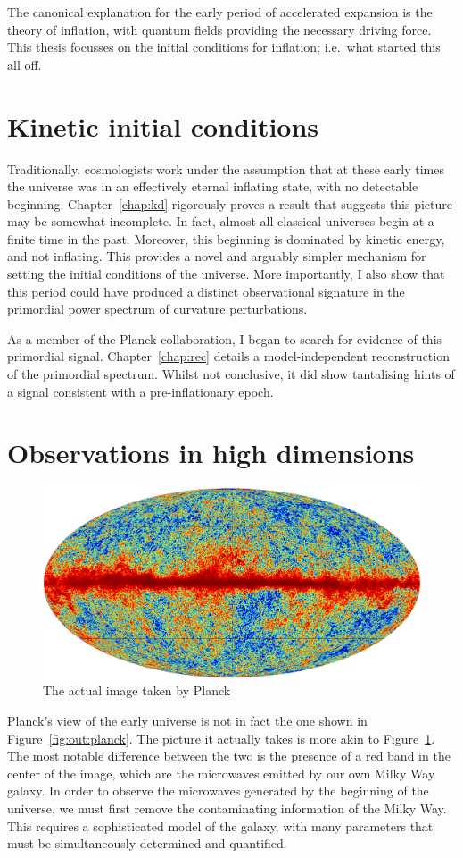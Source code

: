 The canonical explanation for the early period of accelerated expansion is the theory of inflation, with quantum fields providing the necessary driving force. This thesis focusses on the initial conditions for inflation; i.e.\ what started this all off.

\section{Kinetic initial conditions}

Traditionally, cosmologists work under the assumption that at these early times the universe was in an effectively eternal inflating state, with no detectable beginning. Chapter~\ref{chap:kd} rigorously proves a result that suggests this picture may be somewhat incomplete. In fact, almost all classical universes begin at a finite time in the past. Moreover, this beginning is dominated by kinetic energy, and not inflating. This provides a novel and arguably simpler mechanism for setting the initial conditions of the universe. More importantly, I also show that this period could have produced a distinct observational signature in the primordial power spectrum of curvature perturbations.

As a member of the Planck collaboration, I began to search for evidence of this primordial signal. Chapter~\ref{chap:rec} details a model-independent reconstruction of the primordial spectrum. Whilst not conclusive, it did show tantalising hints of a signal consistent with a pre-inflationary epoch.

\section{Observations in high dimensions}
\begin{figure}[tp]
  \includegraphics[width=\textwidth]{chapters/outline/figures/planck_galaxy}
  \caption{The actual image taken by Planck}\label{fig:out:planck_galaxy}
\end{figure}
Planck's view of the early universe is not in fact the one shown in Figure~\ref{fig:out:planck}. The picture it actually takes is more akin to Figure~\ref{fig:out:planck_galaxy}. The most notable difference between the two is the presence of a red band in the center of the image, which are the microwaves emitted by our own Milky Way galaxy. In order to observe the microwaves generated by the beginning of the universe, we must first remove the contaminating information of the Milky Way. This requires a sophisticated model of the galaxy, with many parameters that must be simultaneously determined and quantified. 

